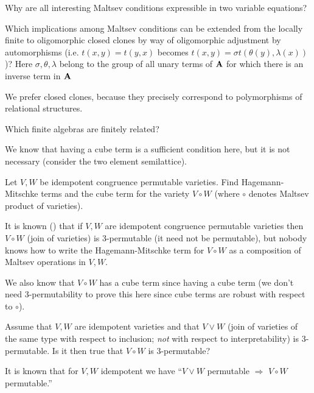\begin{question}
  Why are all interesting Maltsev conditions expressible in two variable
equations?
\end{question}
\begin{question}
  Which implications among Maltsev conditions can be extended from the locally
finite to oligomorphic closed clones by way of oligomorphic adjustment by
automorphisms (i.e. $t(x,y)=t(y,x)$ becomes $t(x,y)=\sigma
t(\theta(y),\lambda(x))$)? Here $\sigma, \theta, \lambda$ belong to the group of all
unary terms of ${\mathbf{A}}$ for which there is an inverse term in ${\mathbf{A}}$
\end{question}
\begin{context}
  We prefer closed clones, because they precisely correspond to polymorphisms
of relational structures.
\end{context}
\begin{question}
  Which finite \SDmeet{} algebras are finitely related?
\end{question}
\begin{context}
  We know that having a cube term is a sufficient condition here, but it is not
necessary (consider the two element semilattice).
\end{context}
\begin{question}
 Let $V,W$ be idempotent congruence permutable varieties. Find 
Hagemann-Mitschke terms and the cube term for the variety $V\circ W$ 
(where $\circ$ denotes Maltsev product of varieties).
\end{question}
\begin{context}
  It is known (\cite{freese-mckenzie-robust}) that if $V,W$ are idempotent congruence permutable
  varieties then $V\circ W$ (join of varieties) is 3-permutable (it need not be permutable), but
nobody knows how to write the Hagemann-Mitschke term for $V\circ W$ as a
composition of Maltsev operations in $V,W$. 

We also know that $V\circ W$ has a cube term since having a cube term (we don't
need 3-permutability to prove this here since cube terms are robust with
respect to $\circ$).
\end{context}

\begin{question}
  Assume that $V,W$ are idempotent varieties and that $V\vee W$ (join of
  varieties of the same type with respect to inclusion; \emph{not} with respect to
  interpretability) is 3-permutable. Is it then true that $V\circ W$ is 3-permutable?
\end{question}
\begin{context}
  It is known that for $V,W$ idempotent we have ``$V\vee W$ permutable
$\Rightarrow$ $V\circ W$ permutable.''
\end{context}

